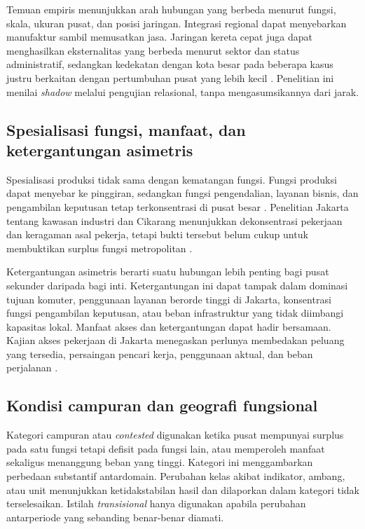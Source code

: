 \documentclass[12pt,a4paper,oneside,openany,indonesian]{report}
\begin{document}
Temuan empiris menunjukkan arah hubungan yang berbeda menurut fungsi, skala, ukuran pusat, dan posisi jaringan. Integrasi regional dapat menyebarkan manufaktur sambil memusatkan jasa. Jaringan kereta cepat juga dapat menghasilkan eksternalitas yang berbeda menurut sektor dan status administratif, sedangkan kedekatan dengan kota besar pada beberapa kasus justru berkaitan dengan pertumbuhan pusat yang lebih kecil \parencite{zhenshilu2023,shietal2025,partridgeetal2009,sunding2016}. Penelitian ini menilai \textit{shadow} melalui pengujian relasional, tanpa mengasumsikannya dari jarak.

\subsection{Spesialisasi fungsi, manfaat, dan ketergantungan asimetris}

Spesialisasi produksi tidak sama dengan kematangan fungsi. Fungsi produksi dapat menyebar ke pinggiran, sedangkan fungsi pengendalian, layanan bisnis, dan pengambilan keputusan tetap terkonsentrasi di pusat besar \parencite{durantonpuga2005}. Penelitian Jakarta tentang kawasan industri dan Cikarang menunjukkan dekonsentrasi pekerjaan dan keragaman asal pekerja, tetapi bukti tersebut belum cukup untuk membuktikan surplus fungsi metropolitan \parencite{hudalahetal2013,permatasarihudalah2013}.

Ketergantungan asimetris berarti suatu hubungan lebih penting bagi pusat sekunder daripada bagi inti. Ketergantungan ini dapat tampak dalam dominasi tujuan komuter, penggunaan layanan berorde tinggi di Jakarta, konsentrasi fungsi pengambilan keputusan, atau beban infrastruktur yang tidak diimbangi kapasitas lokal. Manfaat akses dan ketergantungan dapat hadir bersamaan. Kajian akses pekerjaan di Jakarta menegaskan perlunya membedakan peluang yang tersedia, persaingan pencari kerja, penggunaan aktual, dan beban perjalanan \parencite{andani2021,aritenang2022,andani2025}.

\subsection{Kondisi campuran dan geografi fungsional}

Kategori campuran atau \textit{contested} digunakan ketika pusat mempunyai surplus pada satu fungsi tetapi defisit pada fungsi lain, atau memperoleh manfaat sekaligus menanggung beban yang tinggi. Kategori ini menggambarkan perbedaan substantif antardomain. Perubahan kelas akibat indikator, ambang, atau unit menunjukkan ketidakstabilan hasil dan dilaporkan dalam kategori tidak terselesaikan. Istilah \textit{transisional} hanya digunakan apabila perubahan antarperiode yang sebanding benar-benar diamati.
\end{document}
